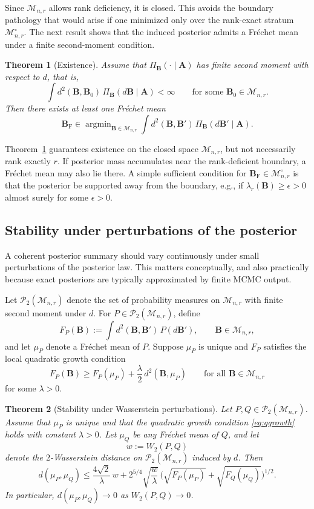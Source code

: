 \documentclass[12pt]{article}
\DeclareMathOperator*{\argmin}{argmin}
\newcommand{\calP}{\mathcal{P}}
\newcommand{\calMnr}{\mathcal{M}_{n,r}}
\newcommand{\calMnro}{\mathcal{M}^{\circ}_{n,r}} %
\newcommand{\bfA}{\boldsymbol{A}}
\newcommand{\bfB}{\boldsymbol{B}}
\newcommand{\Frechet}{Fr\'{e}chet\xspace}
\newcommand{\BF}{\bfB_{\mathrm{F}}}
\newtheorem{theorem}{Theorem}
\begin{document}
Since $\calMnr$ allows rank deficiency, it is closed. This avoids the boundary pathology that would
arise if one minimized only over the rank-exact stratum $\calMnro$. The next result shows that the
induced posterior admits a \Frechet mean under a finite second-moment condition.

\begin{theorem}[Existence]\label{thm:existence}
Assume that $\Pi_{\bfB}(\cdot\mid \bfA)$ has finite second moment with respect to $d$, that is,
\[
\int d^2(\bfB,\bfB_0)\,\Pi_{\bfB}(d\bfB\mid \bfA)<\infty
\qquad\text{for some }\bfB_0\in\calMnr.
\]
Then there exists at least one \Frechet mean
\[
\BF\in\argmin_{\bfB\in\calMnr}
\int d^2(\bfB,\bfB')\,\Pi_{\bfB}(d\bfB'\mid \bfA).
\]
\end{theorem}

Theorem~\ref{thm:existence} guarantees existence on the closed space $\calMnr$, but not necessarily
rank exactly $r$. If posterior mass accumulates near the rank-deficient boundary, a \Frechet mean
may also lie there. A simple sufficient condition for $\BF\in\calMnro$ is that the posterior be
supported away from the boundary, e.g., if $\lambda_r(\bfB)\ge \epsilon>0$ almost surely for
some $\epsilon>0$.

\subsection{Stability under perturbations of the posterior}\label{subsec:stability}

A coherent posterior summary should vary continuously under small perturbations of the posterior law.
This matters conceptually, and also practically because exact posteriors are typically approximated
by finite MCMC output.

Let $\calP_2(\calMnr)$ denote the set of probability measures on $\calMnr$ with finite second
moment under $d$. For $P\in\calP_2(\calMnr)$, define
\[
F_P(\bfB):=\int d^2(\bfB,\bfB')\,P(d\bfB'),\qquad \bfB\in\calMnr,
\]
and let $\mu_P$ denote a \Frechet mean of $P$. Suppose $\mu_P$ is unique and $F_P$ satisfies the
local quadratic growth condition
\begin{equation}\label{eq:qgrowth}
F_P(\bfB)\ge F_P(\mu_P)+\frac{\lambda}{2}\,d^2(\bfB,\mu_P)
\qquad \text{for all } \bfB\in\calMnr
\end{equation}
for some $\lambda>0$.

\begin{theorem}[Stability under Wasserstein perturbations]\label{thm:stability}
Let $P,Q\in\calP_2(\calMnr)$. Assume that $\mu_P$ is unique and that the quadratic growth condition
\eqref{eq:qgrowth} holds with constant $\lambda>0$. Let $\mu_Q$ be any \Frechet mean of $Q$, and let
\[
w:=W_2(P,Q)
\]
denote the $2$-Wasserstein distance on $\calP_2(\calMnr)$ induced by $d$. Then
\[
d(\mu_P,\mu_Q)
\le
\frac{4\sqrt{2}}{\lambda}\,w
+
2^{5/4}\sqrt{\frac{w}{\lambda}}\,
\Big(\sqrt{F_P(\mu_P)}+\sqrt{F_Q(\mu_Q)}\Big)^{1/2}.
\]
In particular, $d(\mu_P,\mu_Q)\to 0$ as $W_2(P,Q)\to 0$.
\end{theorem}
\end{document}
